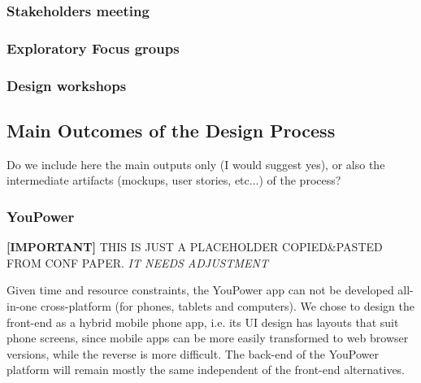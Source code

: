 \subsubsection{Stakeholders meeting}

\subsubsection{Exploratory Focus groups}

\subsubsection{Design workshops}



\subsection{Main Outcomes of the Design Process} %
\begin{svgraybox}
[note by GP] Do we include here the main outputs only (I would suggest yes), or also the intermediate artifacts (mockups, user stories, etc...) of the process?
\end{svgraybox}

\subsubsection{YouPower} %
\begin{svgraybox}
\textbf{[IMPORTANT]} THIS IS JUST A PLACEHOLDER COPIED\&PASTED FROM CONF PAPER. \textit{IT NEEDS ADJUSTMENT}
\end{svgraybox}

\noindent Given time and resource constraints, the YouPower app can not be developed all-in-one cross-platform (for phones, tablets and computers). We chose to design the front-end as a hybrid mobile phone app, i.e. its UI design has layouts that suit phone screens, %
since mobile apps can be more easily transformed to web browser versions, while the reverse is more difficult.
The back-end of the YouPower platform will remain mostly the same independent of the front-end alternatives. 

